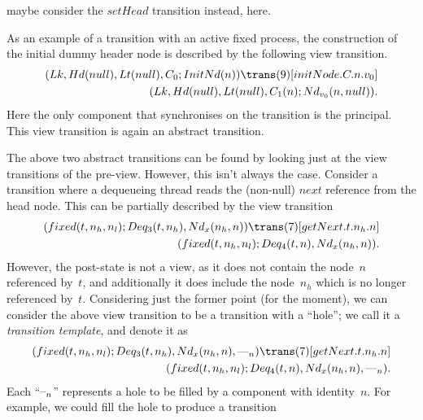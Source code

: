  maybe consider the $setHead$ transition instead, here. 

As an example of a transition with an active fixed process, the construction
of the initial dummy header node is described by the following view
transition.
\[
\begin{align}
(\Lock, \Head(null), \Last(null), \Con_0; \InitNode(n)) 
  \trans(9)[initNode.C.n.v_0] \\
\qquad (\Lock, \Head(null), \Last(null), \Con_1(n); \Node_{v_0}(n, null)).
\end{align}
\]
Here the only component that synchronises on the transition is the principal.
This view transition is again an abstract transition.

The above two abstract transitions can be found by looking just at the view
transitions of the pre-view.  However, this isn't always the case.
%
Consider a transition where a dequeueing thread reads the (non-null) $next$
reference from the head node.  This can be partially described by the view
transition
\[
\begin{align}
(fixed(t, n_h, n_l); Deq_3(t, n_h), \Node_x(n_h, n))
  \trans(7)[getNext.t.n_h.n] \\
\qquad (fixed(t, n_h, n_l); Deq_4(t, n), \Node_x(n_h, n)).
\end{align}
\]
However, the post-state is not a view, as it does not contain the node~$n$
referenced by~$t$, and additionally it does include the node~$n_h$ which is no
longer referenced by~$t$.  Considering just the former point (for the moment),
we can consider the above view transition to be a transition with a ``hole'';
we call it a \emph{transition template}, and denote it as
\[
\begin{align}
(fixed(t, n_h, n_l); Deq_3(t, n_h), \Node_x(n_h, n), \bighole{n})
  \trans(7)[getNext.t.n_h.n] \\
\qquad (fixed(t, n_h, n_l); Deq_4(t, n), \Node_x(n_h, n), \bighole{n}).
\end{align}
\]
Each ``$\mbox{--}_{n}$'' represents a hole to be filled by a component with
identity~$n$.  For example, we could fill the hole to produce a transition
